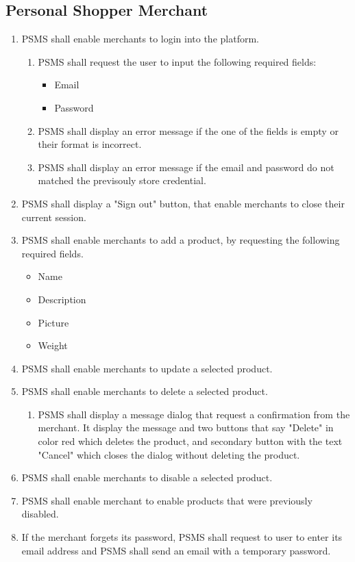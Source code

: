 \subsection{Personal Shopper Merchant}
\begin{enumerate}[resume, label=SY-\arabic*]
    \item PSMS shall enable merchants to login into the platform.
    \begin{enumerate}[label=SY-20.\arabic*]
        \item PSMS shall request the user to input the following required 
        fields:
        \begin{itemize}
            \item Email
            \item Password
        \end{itemize}
        \item PSMS shall display an error message if the one of the fields is 
        empty or their format is incorrect.
        \item PSMS shall display an error message if the email and password 
        do not matched the previsouly store credential.
    \end{enumerate}
    \item PSMS shall display a "Sign out" button, that enable merchants to 
    close their current session.
    \item PSMS shall enable merchants to add a product, by requesting the 
    following required fields.
    \begin{itemize}
        \item Name
        \item Description
        \item Picture
        \item Weight
    \end{itemize}
    \item PSMS shall enable merchants to update a selected product.
    \item PSMS shall enable merchants to delete a selected product.
    \begin{enumerate}[label=SY-24.\arabic*]
        \item PSMS shall display a message dialog that request a confirmation 
        from the merchant. It display the message and two buttons that say
        "Delete" in color red which deletes the product, and secondary button 
        with the text "Cancel" which closes the dialog without deleting the 
        product.
    \end{enumerate}
    \item PSMS shall enable merchants to disable a selected product.
    \item PSMS shall enable merchant to enable products that were 
    previously disabled.
    \item If the merchant forgets its password, PSMS shall request to user 
    to enter its email address and PSMS shall send an email with a 
    temporary password.
\end{enumerate}

